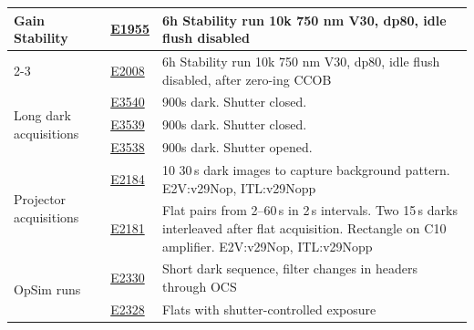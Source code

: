 \begin{longtable}{|p{5.0cm}|p{1.5cm}|p{8.5cm}|}
\multirow{3}{*}{Gain Stability} & \href{https://s3df.slac.stanford.edu/data/rubin/lsstcam/E1955/w_2024_35/}{E1955} & 6h Stability run 10k 750 nm V30, dp80, idle flush disabled \\ \cline{2-3} 
                                & \href{https://s3df.slac.stanford.edu/data/rubin/lsstcam/E2008/w_2024_35/}{E2008} & 6h Stability run 10k 750 nm V30, dp80, idle flush disabled, after zero-ing CCOB \\ \hline

\multirow{3}{*}{Long dark acquisitions} & \href{https://s3df.slac.stanford.edu/data/rubin/lsstcam/E3540/w_2024_35/}{E3540} & 900s dark. Shutter closed. \\ \cline{2-3} 
                                       & \href{https://s3df.slac.stanford.edu/data/rubin/lsstcam/E3539/w_2024_35/}{E3539} & 900s dark. Shutter closed. \\ \cline{2-3} 
                                       & \href{https://s3df.slac.stanford.edu/data/rubin/lsstcam/E3538/w_2024_35/}{E3538} & 900s dark. Shutter opened. \\ \hline

\multirow{2}{*}{Projector acquisitions} & \href{https://s3df.slac.stanford.edu/data/rubin/lsstcam/E2184/w_2024_35/}{E2184} & 10 30\,s dark images to capture background pattern. E2V:v29Nop, ITL:v29Nopp \\ \cline{2-3} 
                                        & \href{https://s3df.slac.stanford.edu/data/rubin/lsstcam/E2181/w_2024_35/}{E2181} & Flat pairs from 2--60\,s in 2\,s intervals. Two 15\,s darks interleaved after flat acquisition. Rectangle on C10 amplifier. E2V:v29Nop, ITL:v29Nopp \\ \hline

\multirow{2}{*}{OpSim runs}  & \href{https://s3df.slac.stanford.edu/data/rubin/lsstcam/E2330/w_2024_35/}{E2330} & Short dark sequence, filter changes in headers through OCS \\ \cline{2-3} 
                             & \href{https://s3df.slac.stanford.edu/data/rubin/lsstcam/E2328/w_2024_35/}{E2328} & Flats with shutter-controlled exposure \\ \hline


\end{longtable}
